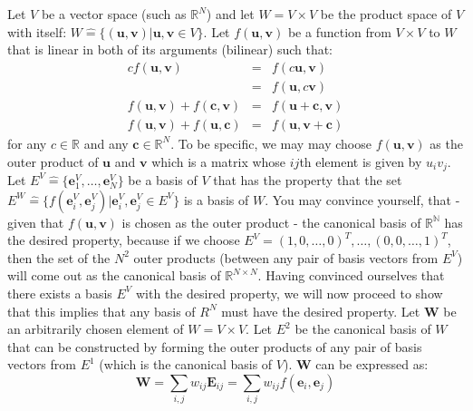 \vspace{10pt}
\footnotesize
Let $V$ be a vector space (such as $\mathbb{R}^N$) and let $W = V \times V$ be the product space of $V$ with itself: $W \hat{=} \{ (\mathbf{u}, \mathbf{v}) | \mathbf{u}, \mathbf{v} \in V \}$. Let $f(\mathbf{u}, \mathbf{v})$ be a function from $V \times V$ to $W$ that is linear in both of its arguments (bilinear) such that: 
\begin{eqnarray}
\label{Eq:Bilinearity}
 c f(\mathbf{u}, \mathbf{v})                           &=& f(c \mathbf{u}, \mathbf{v})            \\ 
                                                       &=& f(\mathbf{u}, c\mathbf{v})             \\
 f(\mathbf{u}, \mathbf{v}) + f(\mathbf{c}, \mathbf{v}) &=& f(\mathbf{u} + \mathbf{c}, \mathbf{v}) \\ 
 f(\mathbf{u}, \mathbf{v}) + f(\mathbf{u}, \mathbf{c}) &=& f(\mathbf{u}, \mathbf{v} + \mathbf{c})
\end{eqnarray}
for any $c \in \mathbb{R}$ and any $\mathbf{c} \in \mathbb{R}^N$. To be specific, we may may choose $f(\mathbf{u}, \mathbf{v})$ as the outer product of $\mathbf{u}$ and $\mathbf{v}$ which is a matrix whose $ij$th element is given by $u_i v_j$. Let $E^V \hat{=} \{\mathbf{e}_1^V, \ldots, \mathbf{e}_N^V\}$ be a basis of $V$ that has the property that the set $E^W \hat{=} \{ f(\mathbf{e}_i^V, \mathbf{e}_j^V) | \mathbf{e}_i^V, \mathbf{e}_j^V \in E^V\}$ is a basis of $W$. You may convince yourself, that - given that $f(\mathbf{u}, \mathbf{v})$ is chosen as the outer product - the canonical basis of $\mathbb{R^N}$ has the desired property, because if we choose $E^V = (1, 0, \ldots, 0)^T, \ldots, (0, 0, \ldots, 1)^T$, then the set of the $N^2$ outer products (between any pair of basis vectors from $E^V$) will come out as the canonical basis of $\mathbb{R}^{N \times N}$. Having convinced ourselves that there exists a basis $E^V$ with the desired property, we will now proceed to show that this implies that any basis of $R^N$ must have the desired property. Let $\mathbf{W}$ be an arbitrarily chosen element of $W = V \times V$. Let $E^2$ be the canonical basis of $W$ that can be constructed by forming the outer products of any pair of basis vectors from $E^1$ (which is the canonical basis of $V$). $\mathbf{W}$ can be expressed as:
\begin{equation}
 \mathbf{W} = \sum_{i,j} w_{ij} \mathbf{E}_{ij} = \sum_{i,j} w_{ij} f(\mathbf{e}_i, \mathbf{e}_j)
\end{equation}
